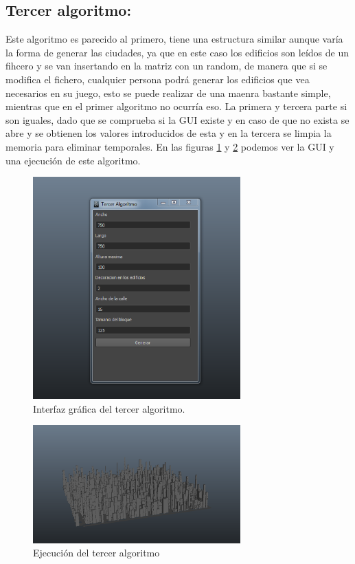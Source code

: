 \subsection{Tercer algoritmo:}

Este algoritmo es parecido al primero, tiene una estructura similar aunque varía la forma de generar las ciudades, ya que en este caso los edificios son leídos de un fihcero y se van insertando en la matriz con un random, de manera que si se modifica el fichero,  cualquier persona podrá generar los edificios que vea necesarios en su juego, esto se puede realizar de una maenra bastante simple, mientras que en el primer algoritmo no ocurría eso. La primera y tercera parte si son iguales, dado que se comprueba si la GUI existe y en caso de que no exista se abre y se obtienen los valores introducidos de esta y en la tercera se limpia la memoria para eliminar temporales. En las figuras \ref{Figura8} y \ref{Figura9} podemos ver la GUI y una ejecución de este algoritmo.

\begin{figure}[h!]

	\centering
	\includegraphics[width=8cm]{./eps/GUItercera.eps}
	\caption{Interfaz gráfica del tercer algoritmo.}
	\label{Figura8}

\end{figure}

\begin{figure}[h!]

	\centering
	\includegraphics[width=8cm]{./eps/terceralgoritmo.eps}
	\caption{Ejecución del tercer algoritmo}
	\label{Figura9}

\end{figure}

\newpage

